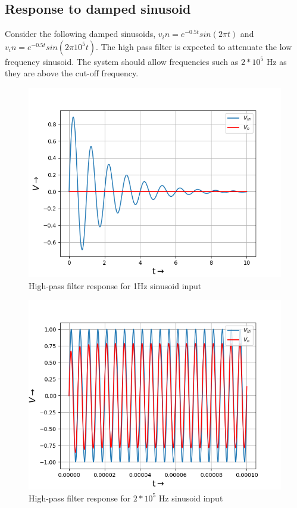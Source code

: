 \documentclass[11pt, a4paper]{article}
\begin{document}
   \subsection{Response to damped sinusoid}
   Consider the following damped sinusoids, $v_in = e^{-0.5t}sin(2 \pi t)$ and $v_in = e^{-0.5t}sin(2 \pi 10^5t)$.
   \newline
   The high pass filter is expected to attenuate the low frequency sinusoid.
The system should allow frequencies such as $2*10^5$ Hz as they are above the
cut-off frequency.
\begin{figure}[!tbh]
   	\centering
   	\includegraphics[scale=0.5]{fig3.png}  %
   	\caption{High-pass filter response for 1Hz sinusoid input}
   	\label{fig:sample}
   \end{figure}
  \begin{figure}[!tbh]
   	\centering
   	\includegraphics[scale=0.5]{fig4.png}  %
   	\caption{High-pass filter response for $2*10^5$ Hz sinusoid input}
   	\label{fig:sample}
   \end{figure}
   \newpage
\end{document}
